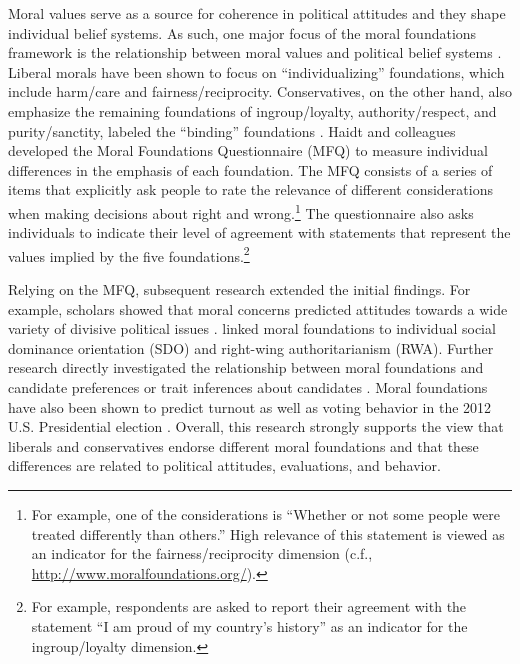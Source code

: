 \documentclass[12pt]{article}
\begin{document}
Moral values serve as a source for coherence in political attitudes and they shape individual belief systems. As such, one major focus of the moral foundations framework is the relationship between moral values and political belief systems \citep[c.f.,][]{haidt2012righteous}. Liberal morals have been shown to focus on ``individualizing'' foundations, which include harm/care and fairness/reciprocity. Conservatives, on the other hand, also emphasize the remaining foundations of ingroup/loyalty, authority/respect, and purity/sanctity, labeled the ``binding'' foundations \citep{haidt2007morality,graham2009liberals}. Haidt and colleagues developed the Moral Foundations Questionnaire (MFQ) to measure individual differences in the emphasis of each foundation. The MFQ consists of a series of items that explicitly ask people to rate the relevance of different considerations when making decisions about right and wrong.\footnote{For example, one of the considerations is ``Whether or not some people were treated differently than others.'' High relevance of this statement is viewed as an indicator for the fairness/reciprocity dimension (c.f., \url{http://www.moralfoundations.org/}).} The questionnaire also asks individuals to indicate their level of agreement with statements that represent the values implied by the five foundations.\footnote{For example, respondents are asked to report their agreement with the statement ``I am proud of my country's history'' as an indicator for the ingroup/loyalty dimension.}

Relying on the MFQ, subsequent research extended the initial findings. For example, scholars showed that moral concerns predicted attitudes towards a wide variety of divisive political issues \citep[e.g.][]{koleva2012tracing,kertzer2014moral,low2015moral}. \citet{federico2013mapping} linked moral foundations to individual social dominance orientation (SDO) and right-wing authoritarianism (RWA). Further research directly investigated the relationship between moral foundations and candidate preferences \citep{iyer2010beyond} or trait inferences about candidates \citep{clifford2014linking}. Moral foundations have also been shown to predict turnout \citep{johnson2014ideology} as well as voting behavior in the 2012 U.S. Presidential election \citep{franks2015using}. Overall, this research strongly supports the view that liberals and conservatives endorse different moral foundations and that these differences are related to political attitudes, evaluations, and behavior.
\end{document}
